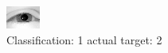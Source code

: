 \begin{figure}[h!]
\begin{center}
\includegraphics[width=0.60\columnwidth]{figures/ID2282_class_1_target_2.png}
\end{center}
\caption{ Classification: 1 actual target: 2}
\label{fig:ID2282_class_1_target_2}
\end{figure}
